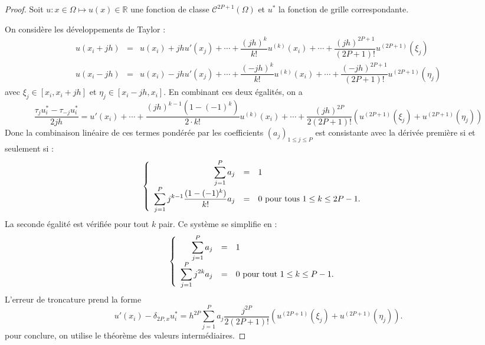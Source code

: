 \begin{proof}
Soit $u : x \in \Omega \mapsto u(x) \in \mathbb{R}$ une fonction de classe $\mathcal{C}^{2P+1}( \Omega)$ et $u^*$ la fonction de grille correspondante.

On considère les développements de Taylor :
\begin{equation}
\begin{array}{rcl}
u(x_i + jh) & = & u(x_i) + j h u'(x_j) + \cdots + \dfrac{(jh)^k}{k!}u^{(k)}(x_i) + \cdots +\dfrac{(jh)^{2P+1}}{(2P+1)!} u^{(2P+1)}(\xi_j)\\
u(x_i - jh) & = & u(x_i) - j h u'(x_j) + \cdots + \dfrac{(-jh)^k}{k!}u^{(k)}(x_i) + \cdots +\dfrac{(-jh)^{2P+1}}{(2P+1)!} u^{(2P+1)}(\eta_j)
\end{array}
\end{equation}
avec $\xi_j \in [x_i, x_i+jh]$ et $\eta_j \in [x_i-jh, x_i]$. En combinant ces deux égalités, on a
\begin{equation}
\dfrac{\tau_ju^*_i - \tau_{-j} u^*_i}{2jh} = u'(x_i) + \cdots + \dfrac{(jh)^{k-1}(1 - (-1)^k)}{2 \cdot k!} u^{(k)}(x_i) + \cdots +\dfrac{(jh)^{2P}}{2(2P+1)!} \left( u^{(2P+1)}(\xi_j) + u^{(2P+1)}(\eta_j) \right)
\end{equation}
Donc la combinaison linéaire de ces termes pondérée par les coefficients $(a_j)_{1 \leq j \leq P}$ est consistante avec la dérivée première si et seulement si :
\begin{equation}
\left\lbrace
\begin{array}{rcll}
\displaystyle\sum\limits_{j=1}^P a_j & = & 1 & \\
\displaystyle\sum\limits_{j=1}^P j^{k-1} \dfrac{(1 - (-1)^k)}{k!} a_j & = & 0 \text{ pour tous } 1 \leq k \leq 2P-1.
\end{array}
\right.
\end{equation}
La seconde égalité est vérifiée pour tout $k$ pair. Ce système se simplifie en :
\begin{equation}
\left\lbrace
\begin{array}{rcll}
\displaystyle\sum\limits_{j=1}^P a_j & = & 1 & \\
\displaystyle\sum\limits_{j=1}^P j^{2k} a_j & = & 0 \text{ pour tout } 1 \leq k \leq P-1.
\end{array}
\right.
\end{equation}
L'erreur de troncature prend la forme
\begin{equation}
u'(x_i) - \delta_{2P,x} u^*_i = h^{2P} \sum_{j=1}^P a_j \dfrac{j^{2P}}{2(2P+1)!} \left( u^{(2P+1)}(\xi_j) + u^{(2P+1)}(\eta_j) \right).
\end{equation}
pour conclure, on utilise le théorème des valeurs intermédiaires.
\end{proof}

